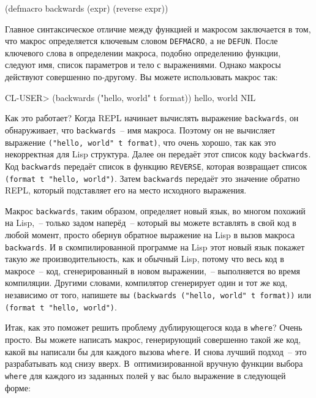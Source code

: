 \begin{myverb}
(defmacro backwards (expr)
  (reverse expr))
\end{myverb}

Главное синтаксическое отличие между функцией и макросом заключается в том, что макрос
определяется ключевым словом \lstinline{DEFMACRO}, а не \lstinline{DEFUN}. После ключевого слова в
определении макроса, подобно определению функции, следуют имя, список параметров и тело с
выражениями. Однако макросы действуют совершенно по-другому. Вы можете использовать макрос
так:

\begin{myverb}
CL-USER> (backwards ("hello, world" t format))
hello, world
NIL
\end{myverb}

Как это работает? Когда REPL начинает вычислять выражение \lstinline{backwards}, он
обнаруживает, что \lstinline{backwards}~-- имя макроса. Поэтому он не вычисляет выражение
\lstinline{("hello, world" t format)}, что очень хорошо, так как это некорректная для Lisp
структура. Далее он передаёт этот список коду \lstinline{backwards}. Код \lstinline{backwards}
передаёт список в функцию \lstinline{REVERSE}, которая возвращает список 
\lstinline{(format t "hello, world")}. Затем \lstinline{backwards} передаёт это значение обратно REPL, который
подставляет его на место исходного выражения.

Макрос \lstinline{backwards}, таким образом, определяет новый язык, во многом похожий на
Lisp,~-- только задом наперёд~-- который вы можете вставлять в свой код в любой момент,
просто обернув обратное выражение на Lisp в вызов макроса \lstinline{backwards}. И в
скомпилированной программе на Lisp этот новый язык покажет такую же производительность,
как и обычный Lisp, потому что весь код в макросе~-- код, сгенерированный в новом
выражении,~-- выполняется во время компиляции. Другими словами, компилятор сгенерирует один
и тот же код, независимо от того, напишете вы \lstinline{(backwards ("hello, world" t format))}
или \lstinline{(format t "hello, world")}.

Итак, как это поможет решить проблему дублирующегося кода в \lstinline{where}? Очень прос\-то. Вы
можете написать макрос, генерирующий совершенно такой же код, какой вы написали бы для
каждого вызова \lstinline{where}. И снова лучший подход~-- это разрабатывать код снизу
вверх. В~оптимизированной вручную функции выбора \lstinline{where} для каждого из заданных
полей у вас было выражение в следующей форме:

